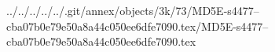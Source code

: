 ../../../../../.git/annex/objects/3k/73/MD5E-s4477--cba07b0e79e50a8a44c050ee6dfe7090.tex/MD5E-s4477--cba07b0e79e50a8a44c050ee6dfe7090.tex